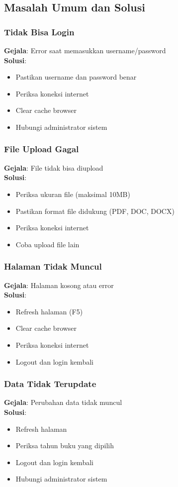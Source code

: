 \documentclass[12pt,a4paper]{article}
\begin{document}
\subsection{Masalah Umum dan Solusi}

\subsubsection{Tidak Bisa Login}
\textbf{Gejala}: Error saat memasukkan username/password\\
\textbf{Solusi}:
\begin{itemize}
    \item Pastikan username dan password benar
    \item Periksa koneksi internet
    \item Clear cache browser
    \item Hubungi administrator sistem
\end{itemize}

\subsubsection{File Upload Gagal}
\textbf{Gejala}: File tidak bisa diupload\\
\textbf{Solusi}:
\begin{itemize}
    \item Periksa ukuran file (maksimal 10MB)
    \item Pastikan format file didukung (PDF, DOC, DOCX)
    \item Periksa koneksi internet
    \item Coba upload file lain
\end{itemize}

\subsubsection{Halaman Tidak Muncul}
\textbf{Gejala}: Halaman kosong atau error\\
\textbf{Solusi}:
\begin{itemize}
    \item Refresh halaman (F5)
    \item Clear cache browser
    \item Periksa koneksi internet
    \item Logout dan login kembali
\end{itemize}

\subsubsection{Data Tidak Terupdate}
\textbf{Gejala}: Perubahan data tidak muncul\\
\textbf{Solusi}:
\begin{itemize}
    \item Refresh halaman
    \item Periksa tahun buku yang dipilih
    \item Logout dan login kembali
    \item Hubungi administrator sistem
\end{itemize}
\end{document}
